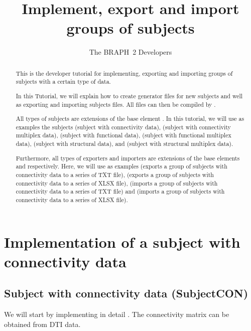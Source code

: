 \documentclass{tufte-handout}
\title{Implement, export and import groups of subjects}
\author[The BRAPH~2 Developers]{The BRAPH~2 Developers}
\begin{document}
\maketitle

\begin{abstract}
This is the developer tutorial for implementing, exporting and importing groups of subjects with a certain type of data.

In this Tutorial, we will explain how to create generator files  for new subjects and well as exporting and importing subjects files. All   files can then be compiled by . 

All types of subjects are extensions of the base element . In this tutorial, we will use as examples the subjects  (subject with connectivity data),  (subject with connectivity multiplex data),  (subject with functional data),  (subject with functional multiplex data),  (subject with structural data), and  (subject with structural multiplex data). 

Furthermore, all types of exporters and importers are extensions of the base elements  and  respectively. Here, we will use as examples  (exports a group of subjects with connectivity data to a series of TXT file),  (exports a group of subjects with connectivity data to a series of XLSX file),  (imports a group of subjects with connectivity data to a series of TXT file) and  (imports a group of subjects with connectivity data to a series of XLSX file).

\end{abstract}

\tableofcontents

\clearpage
\section{Implementation of a subject with connectivity data}

\subsection{Subject with connectivity data (SubjectCON)}

We will start by implementing in detail . The connectivity matrix can be obtained from DTI data.
\end{document}

